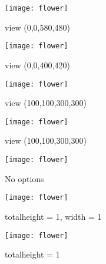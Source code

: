 \documentclass[a4paper,12pt]{report}
\begin{document}

\begin{figure}[htb]
\caption{view (0,0,580,480)}
\begin{center}
\texttt{[image: flower]}
\end{center}
\end{figure}
\clearpage

\begin{figure}[htb]
\caption{view (0,0,400,420)}
\begin{center}
\texttt{[image: flower]}
\end{center}
\end{figure}
\clearpage

\begin{figure}[htb]
\caption{view (100,100,300,300)}
\begin{center}
\texttt{[image: flower]}
\end{center}
\end{figure}
\clearpage

\begin{figure}[htb]
\caption{view (100,100,300,300)}
\begin{center}
\texttt{[image: flower]}
\end{center}
\end{figure}
\clearpage

\begin{figure}[htb]
\caption{No options}
\begin{center}
\texttt{[image: flower]}
\end{center}
\end{figure}
\clearpage

\begin{figure}[htb]
\caption{totalheight = 1, width = 1}
\begin{center}
\texttt{[image: flower]}
\end{center}
\end{figure}
\clearpage

\begin{figure}[htb]
\caption{totalheight = 1}
\begin{center}
\texttt{[image: flower]}
\end{center}
\end{figure}
\clearpage
\end{document}
